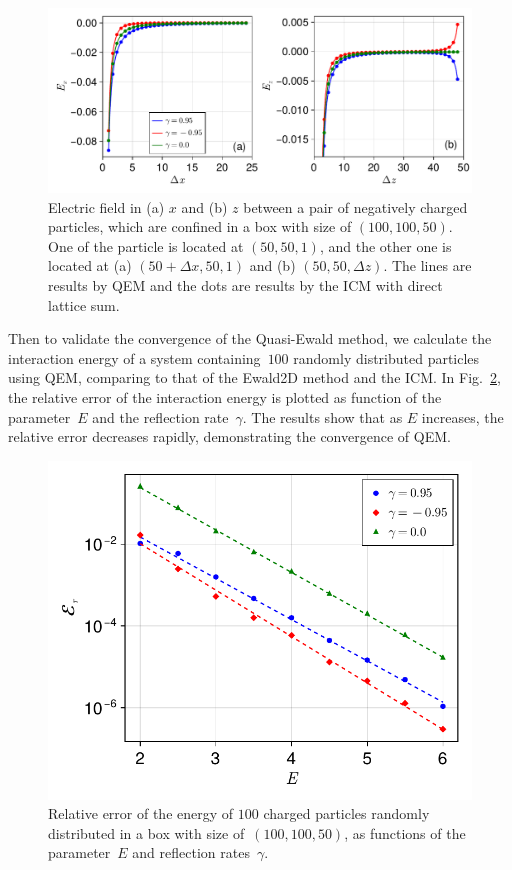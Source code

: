 \begin{figure}[htb]
    \centering
    \includegraphics[width = \linewidth]{figs/E_xyz.pdf}
    \caption{
        Electric field in (a) $x$ and (b) $z$ between a pair of negatively charged particles, which are confined in a box with size of $(100, 100, 50)$.
        One of the particle is located at $(50, 50, 1)$, and the other one is located at (a) $(50 + \Delta x, 50, 1)$ and (b) $(50, 50, \Delta z)$.
        The lines are results by QEM and the dots are results by the ICM with direct lattice sum.
    }
    \label{fig:E_xyz}
\end{figure}

Then to validate the convergence of the Quasi-Ewald method, we calculate the interaction energy of a system containing~$100$ randomly distributed particles using QEM, comparing to that of the Ewald2D method and the ICM.
In Fig.~\ref{fig:Error_E}, the relative error of the interaction energy is plotted as function of the parameter~$E$ and the reflection rate~$\gamma$.
The results show that as $E$ increases, the relative error decreases rapidly, demonstrating the convergence of QEM.

\begin{figure}[htb]
    \centering
    \includegraphics[width = 0.625\linewidth]{figs/e_total.pdf}
    \caption{
        Relative error of the energy of $100$ charged particles randomly distributed in a box with size of~$(100, 100, 50)$, as functions of the parameter~$E$ and reflection rates~$\gamma$.
    }
    \label{fig:Error_E}
\end{figure}


